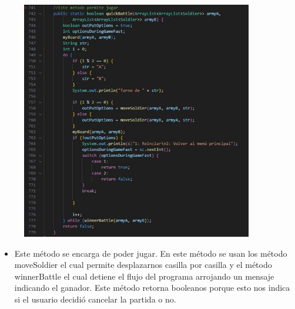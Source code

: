\documentclass{article}
\begin{document}
	\begin{figure}[H]
		\centering
		\includegraphics[width=0.9\textwidth,keepaspectratio]{img/quickBattle.jpg}
	\end{figure}
	
	\begin{itemize}	
		\item Este método se encarga de poder jugar. En este método se usan los método moveSoldier el cual permite desplazarnos casilla por casilla y el método winnerBattle el cual detiene el flujo del programa arrojando un mensaje indicando el ganador. Este método retorna booleanos porque esto nos indica si el usuario decidió cancelar la partida o no.
	\end{itemize}
	
\end{document}
